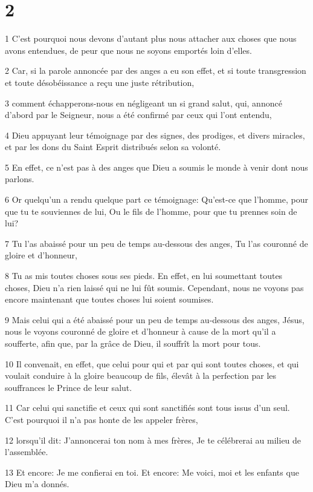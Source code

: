 \chapter{2}

\par 1 C'est pourquoi nous devons d'autant plus nous attacher aux choses que nous avons entendues, de peur que nous ne soyons emportés loin d'elles.
\par 2 Car, si la parole annoncée par des anges a eu son effet, et si toute transgression et toute désobéissance a reçu une juste rétribution,
\par 3 comment échapperons-nous en négligeant un si grand salut, qui, annoncé d'abord par le Seigneur, nous a été confirmé par ceux qui l'ont entendu,
\par 4 Dieu appuyant leur témoignage par des signes, des prodiges, et divers miracles, et par les dons du Saint Esprit distribués selon sa volonté.
\par 5 En effet, ce n'est pas à des anges que Dieu a soumis le monde à venir dont nous parlons.
\par 6 Or quelqu'un a rendu quelque part ce témoignage: Qu'est-ce que l'homme, pour que tu te souviennes de lui, Ou le fils de l'homme, pour que tu prennes soin de lui?
\par 7 Tu l'as abaissé pour un peu de temps au-dessous des anges, Tu l'as couronné de gloire et d'honneur,
\par 8 Tu as mis toutes choses sous ses pieds. En effet, en lui soumettant toutes choses, Dieu n'a rien laissé qui ne lui fût soumis. Cependant, nous ne voyons pas encore maintenant que toutes choses lui soient soumises.
\par 9 Mais celui qui a été abaissé pour un peu de temps au-dessous des anges, Jésus, nous le voyons couronné de gloire et d'honneur à cause de la mort qu'il a soufferte, afin que, par la grâce de Dieu, il souffrît la mort pour tous.
\par 10 Il convenait, en effet, que celui pour qui et par qui sont toutes choses, et qui voulait conduire à la gloire beaucoup de fils, élevât à la perfection par les souffrances le Prince de leur salut.
\par 11 Car celui qui sanctifie et ceux qui sont sanctifiés sont tous issus d'un seul. C'est pourquoi il n'a pas honte de les appeler frères,
\par 12 lorsqu'il dit: J'annoncerai ton nom à mes frères, Je te célébrerai au milieu de l'assemblée.
\par 13 Et encore: Je me confierai en toi. Et encore: Me voici, moi et les enfants que Dieu m'a donnés.
